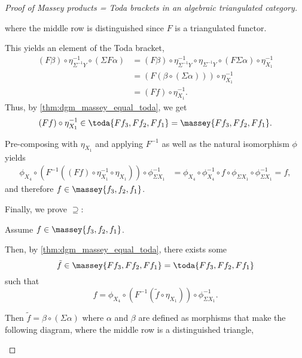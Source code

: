 \begin{proof}[Proof of Massey products = Toda brackets in an algebraic triangulated category]
\begin{center}
    \end{center}

    where the middle row is distinguished since \( F \) is a triangulated functor.

    This yields an element of the Toda bracket,
    \begin{align*}
        (F \beta) \circ \eta^{-1}_{\Sigma^{-1} Y} \circ (\Sigma F \alpha) &= (F \beta) \circ \eta^{-1}_{\Sigma^{-1} Y} \circ \eta_{\Sigma^{-1} Y} \circ (F \Sigma \alpha) \circ \eta^{-1}_{X_1} \\
        &= (F (\beta \circ (\Sigma \alpha))) \circ \eta^{-1}_{X_1} \\
        &= (F f ) \circ \eta^{-1}_{X_1}.
    \end{align*}
    Thus, by \autoref{thm:dgm_massey_equal_toda}, we get
    \[
        (F f ) \circ \eta^{-1}_{X_1} \in \toda{F f_3, F f_2, F f_1} = \massey{F f_3, F f_2, F f_1}.
    \]

    Pre-composing with \( \eta_{X_1} \) and applying \( F^{-1} \) as well as the natural isomorphism \( \phi \) yields
    \begin{align*}
        \phi_{X_4} \circ (F^{-1} ((F f ) \circ \eta^{-1}_{X_1} \circ \eta_{X_1})) \circ \phi^{-1}_{\Sigma X_1} &= \phi_{X_4} \circ \phi^{-1}_{X_4} \circ f \circ \phi_{\Sigma X_1} \circ \phi^{-1}_{\Sigma X_1} = f,
    \end{align*}
    and therefore \( f \in \massey{f_3, f_2, f_1} \).

    Finally, we prove \( \supseteq \):

    Assume \( f \in \massey{f_3, f_2, f_1} \).

    Then, by \autoref{thm:dgm_massey_equal_toda}, there exists some
    \[
        \tilde{f} \in \massey{F f_3, F f_2, F f_1} = \toda{F f_3, F f_2, F f_1}
    \]
    such that
    \[
        f = \phi_{X_4} \circ (F^{-1} (\tilde{f} \circ \eta_{X_1})) \circ \phi^{-1}_{\Sigma X_1}.
    \]

    Then \( \tilde{f} = \beta \circ (\Sigma \alpha) \) where \( \alpha \) and \( \beta \) are defined as morphisms that make the following diagram, where the middle row is a distinguished triangle,
    \begin{center}
\end{center}
\end{proof}
